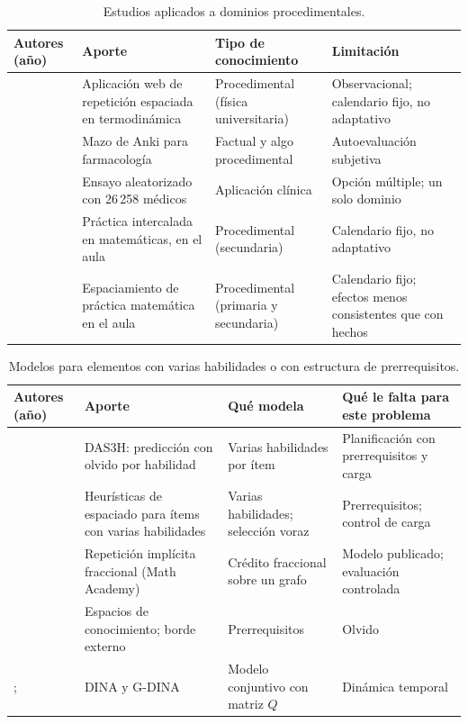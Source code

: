 \documentclass[12pt]{article}
\theoremstyle{definition}
\begin{document}
\begin{table}[H]
\centering\small
\caption{Estudios aplicados a dominios procedimentales.}
\label{tab:procedimental}
\begin{tabularx}{\textwidth}{@{}P{2.7cm}YYY@{}}
\toprule
\textbf{Autores (año)} & \textbf{Aporte} & \textbf{Tipo de conocimiento} & \textbf{Limitación} \\
\midrule
\citet{voice2020} & Aplicación web de repetición espaciada en termodinámica & Procedimental (física universitaria) & Observacional; calendario fijo, no adaptativo \\
\citet{jape2022} & Mazo de Anki para farmacología & Factual y algo procedimental & Autoevaluación subjetiva \\
\citet{price2025} & Ensayo aleatorizado con 26\,258 médicos & Aplicación clínica & Opción múltiple; un solo dominio \\
\citet{rohrer2015} & Práctica intercalada en matemáticas, en el aula & Procedimental (secundaria) & Calendario fijo, no adaptativo \\
\citet{barzagar2019} & Espaciamiento de práctica matemática en el aula & Procedimental (primaria y secundaria) & Calendario fijo; efectos menos consistentes que con hechos \\
\bottomrule
\end{tabularx}
\end{table}

\begin{table}[H]
\centering\small
\caption{Modelos para elementos con varias habilidades o con estructura de prerrequisitos.}
\label{tab:multi}
\begin{tabularx}{\textwidth}{@{}P{2.7cm}YYY@{}}
\toprule
\textbf{Autores (año)} & \textbf{Aporte} & \textbf{Qué modela} & \textbf{Qué le falta para este problema} \\
\midrule
\citet{choffin2019} & DAS3H: predicción con olvido por habilidad & Varias habilidades por ítem & Planificación con prerrequisitos y carga \\
\citet{choffin2021} & Heurísticas de espaciado para ítems con varias habilidades & Varias habilidades; selección voraz & Prerrequisitos; control de carga \\
\citet{skycak2023} & Repetición implícita fraccional (Math Academy) & Crédito fraccional sobre un grafo & Modelo publicado; evaluación controlada \\
\citet{doignon1985} & Espacios de conocimiento; borde externo & Prerrequisitos & Olvido \\
\citet{junker2001}; \citet{delatorre2011} & DINA y G-DINA & Modelo conjuntivo con matriz $Q$ & Dinámica temporal \\
\bottomrule
\end{tabularx}
\end{table}
\end{document}
